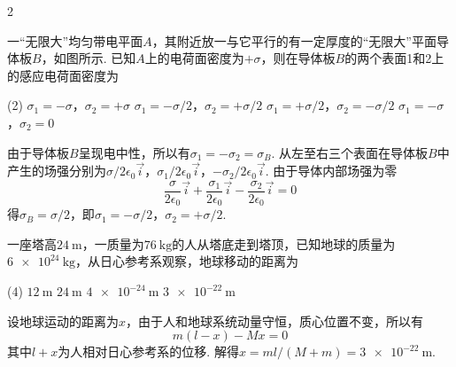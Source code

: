 \documentclass[quiet, fontset = fandol, AutoFakeSlant, 10pt]{ctexart}
\begin{document}
\begin{paracol}{2}
\begin{problem}
    一``无限大''均匀带电平面$A$，其附近放一与它平行的有一定厚度的``无限大''平面导体板$B$，如图所示. 已知$A$上的电荷面密度为$+\sigma$，则在导体板$B$的两个表面1和2上的感应电荷面密度为
    \begin{tasks}(2)
        \task $\sigma_1=-\sigma$，$\sigma_2=+\sigma$
        \task[\true] $\sigma_1=-\sigma/2$，$\sigma_2=+\sigma/2$
        \task $\sigma_1=+\sigma/2$，$\sigma_2=-\sigma/2$
        \task $\sigma_1=-\sigma$，$\sigma_2=0$
    \end{tasks}
\end{problem}
\switchcolumn\vspace*{\fill}
\centering
{}\vspace*{\fill}
\end{paracol}
\begin{solution}
    由于导体板$B$呈现电中性，所以有$\sigma_1=-\sigma_2=\sigma_B$. 从左至右三个表面在导体板$B$中产生的场强分别为$\sigma/2\epsilon_0\vec i$，$\sigma_1/2\epsilon_0\vec i$，$-\sigma_2/2\epsilon_0\vec i$. 由于导体内部场强为零
    \[\frac\sigma{2\epsilon_0}\vec i+\frac{\sigma_1}{2\epsilon_0}\vec i-\frac{\sigma_2}{2\epsilon_0}\vec i=0\]
    得$\sigma_B=\sigma/2$，即$\sigma_1=-\sigma/2$，$\sigma_2=+\sigma/2$.
\end{solution}

\begin{problem}
    一座塔高$\qty{24}\m$，一质量为$\qty{76}\kg$的人从塔底走到塔顶，已知地球的质量为$\qty{6e24}\kg$，从日心参考系观察，地球移动的距离为
    \begin{tasks}(4)
        \task $\qty{12}\m$
        \task $\qty{24}\m$
        \task $\qty{4e-24}\m$
        \task[\true] $\qty{3e-22}\m$
    \end{tasks}
\end{problem}
\begin{solution}
    设地球运动的距离为$x$，由于人和地球系统动量守恒，质心位置不变，所以有
    \[m(l-x)-Mx=0\]
    其中$l+x$为人相对日心参考系的位移. 解得$x=ml/(M+m)=\qty{3e-22}\m$.
\end{solution}
\end{document}
